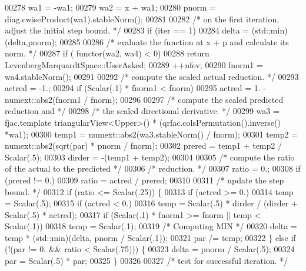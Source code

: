 \begin{DoxyCode}
00278         wa1 = -wa1;
00279         wa2 = x + wa1;
00280         pnorm = diag.cwiseProduct(wa1).stableNorm();
00281 
00282         \textcolor{comment}{/* on the first iteration, adjust the initial step bound. */}
00283         \textcolor{keywordflow}{if} (iter == 1)
00284             delta = (std::min)(delta,pnorm);
00285 
00286         \textcolor{comment}{/* evaluate the function at x + p and calculate its norm. */}
00287         \textcolor{keywordflow}{if} ( functor(wa2, wa4) < 0)
00288             \textcolor{keywordflow}{return} LevenbergMarquardtSpace::UserAsked;
00289         ++nfev;
00290         fnorm1 = wa4.stableNorm();
00291 
00292         \textcolor{comment}{/* compute the scaled actual reduction. */}
00293         actred = -1.;
00294         \textcolor{keywordflow}{if} (Scalar(.1) * fnorm1 < fnorm)
00295             actred = 1. - numext::abs2(fnorm1 / fnorm);
00296 
00297         \textcolor{comment}{/* compute the scaled predicted reduction and */}
00298         \textcolor{comment}{/* the scaled directional derivative. */}
00299         wa3 = fjac.template triangularView<Upper>() * (qrfac.colsPermutation().inverse() *wa1);
00300         temp1 = numext::abs2(wa3.stableNorm() / fnorm);
00301         temp2 = numext::abs2(sqrt(par) * pnorm / fnorm);
00302         prered = temp1 + temp2 / Scalar(.5);
00303         dirder = -(temp1 + temp2);
00304 
00305         \textcolor{comment}{/* compute the ratio of the actual to the predicted */}
00306         \textcolor{comment}{/* reduction. */}
00307         ratio = 0.;
00308         \textcolor{keywordflow}{if} (prered != 0.)
00309             ratio = actred / prered;
00310 
00311         \textcolor{comment}{/* update the step bound. */}
00312         \textcolor{keywordflow}{if} (ratio <= Scalar(.25)) \{
00313             \textcolor{keywordflow}{if} (actred >= 0.)
00314                 temp = Scalar(.5);
00315             \textcolor{keywordflow}{if} (actred < 0.)
00316                 temp = Scalar(.5) * dirder / (dirder + Scalar(.5) * actred);
00317             \textcolor{keywordflow}{if} (Scalar(.1) * fnorm1 >= fnorm || temp < Scalar(.1))
00318                 temp = Scalar(.1);
00319             \textcolor{comment}{/* Computing MIN */}
00320             delta = temp * (std::min)(delta, pnorm / Scalar(.1));
00321             par /= temp;
00322         \} \textcolor{keywordflow}{else} \textcolor{keywordflow}{if} (!(par != 0. && ratio < Scalar(.75))) \{
00323             delta = pnorm / Scalar(.5);
00324             par = Scalar(.5) * par;
00325         \}
00326 
00327         \textcolor{comment}{/* test for successful iteration. */}

\end{DoxyCode}
